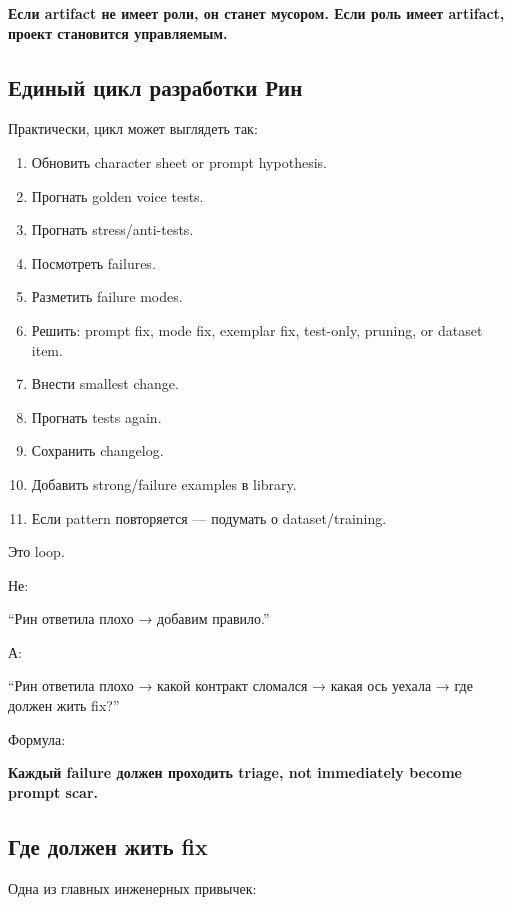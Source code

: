 \textbf{Если artifact не имеет роли, он станет мусором. Если роль имеет
artifact, проект становится управляемым.}

\subsection*{Единый цикл разработки Рин}

Практически, цикл может выглядеть так:

\begin{enumerate}
\def\labelenumi{\arabic{enumi}.}
\tightlist
\item
  Обновить character sheet or prompt hypothesis.
\item
  Прогнать golden voice tests.
\item
  Прогнать stress/\hspace{0pt}anti-tests.
\item
  Посмотреть failures.
\item
  Разметить failure modes.
\item
  Решить: prompt fix, mode fix, exemplar fix, test-only, pruning, or
  dataset item.
\item
  Внести smallest change.
\item
  Прогнать tests again.
\item
  Сохранить changelog.
\item
  Добавить strong/\hspace{0pt}failure examples в library.
\item
  Если pattern повторяется --- подумать о dataset/\hspace{0pt}training.
\end{enumerate}

Это loop.

Не:

``Рин ответила плохо → добавим правило.''

А:

``Рин ответила плохо → какой контракт сломался → какая ось уехала → где
должен жить fix?''

Формула:

\textbf{Каждый failure должен проходить triage, not immediately become
prompt scar.}

\subsection*{Где должен жить fix}

Одна из главных инженерных привычек:

